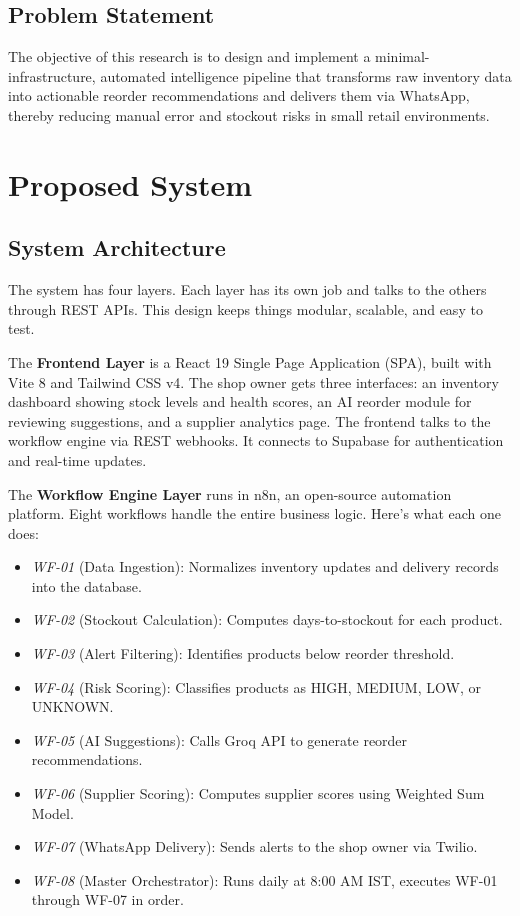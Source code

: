 \documentclass[journal]{IEEEtran}
\begin{document}
\subsection{Problem Statement}
The objective of this research is to design and implement a minimal-infrastructure, automated intelligence pipeline that transforms raw inventory data into actionable reorder recommendations and delivers them via WhatsApp, thereby reducing manual error and stockout risks in small retail environments.

\section{Proposed System}

\subsection{System Architecture}

The system has four layers. Each layer has its own job and talks to the others through REST APIs. This design keeps things modular, scalable, and easy to test.

The \textbf{Frontend Layer} is a React 19 Single Page Application (SPA), built with Vite 8 and Tailwind CSS v4. The shop owner gets three interfaces: an inventory dashboard showing stock levels and health scores, an AI reorder module for reviewing suggestions, and a supplier analytics page. The frontend talks to the workflow engine via REST webhooks. It connects to Supabase for authentication and real-time updates.

The \textbf{Workflow Engine Layer} runs in n8n, an open-source automation platform. Eight workflows handle the entire business logic. Here's what each one does:

\begin{itemize}
\item \textit{WF-01} (Data Ingestion): Normalizes inventory updates and delivery records into the database.
\item \textit{WF-02} (Stockout Calculation): Computes days-to-stockout for each product.
\item \textit{WF-03} (Alert Filtering): Identifies products below reorder threshold.
\item \textit{WF-04} (Risk Scoring): Classifies products as HIGH, MEDIUM, LOW, or UNKNOWN.
\item \textit{WF-05} (AI Suggestions): Calls Groq API to generate reorder recommendations.
\item \textit{WF-06} (Supplier Scoring): Computes supplier scores using Weighted Sum Model.
\item \textit{WF-07} (WhatsApp Delivery): Sends alerts to the shop owner via Twilio.
\item \textit{WF-08} (Master Orchestrator): Runs daily at 8:00 AM IST, executes WF-01 through WF-07 in order.
\end{itemize}
\end{document}
